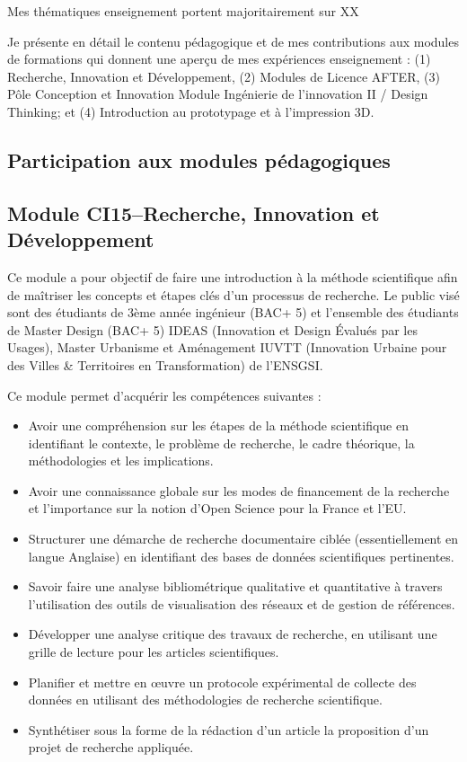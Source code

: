 \documentclass[
  11pt,
]{article}
\providecommand{\tightlist}{%
  \setlength{\itemsep}{0pt}\setlength{\parskip}{0pt}}\usepackage{longtable,booktabs,array}
\begin{document}
Mes thématiques enseignement portent majoritairement sur XX

Je présente en détail le contenu pédagogique et de mes contributions aux
modules de formations qui donnent une aperçu de mes expériences
enseignement : (1) Recherche, Innovation et Développement, (2) Modules
de Licence AFTER, (3) Pôle Conception et Innovation Module Ingénierie de
l'innovation II / Design Thinking; et (4) Introduction au prototypage et
à l'impression 3D.

\hypertarget{participation-aux-modules-puxe9dagogiques}{%
\subsection{Participation aux modules
pédagogiques}\label{participation-aux-modules-puxe9dagogiques}}

\hypertarget{module-ci15recherche-innovation-et-duxe9veloppement}{%
\subsection{Module CI15--Recherche, Innovation et
Développement}\label{module-ci15recherche-innovation-et-duxe9veloppement}}

Ce module a pour objectif de faire une introduction à la méthode
scientifique afin de maîtriser les concepts et étapes clés d'un
processus de recherche. Le public visé sont des étudiants de 3ème année
ingénieur (BAC+ 5) et l'ensemble des étudiants de Master Design (BAC+ 5)
IDEAS (Innovation et Design Évalués par les Usages), Master Urbanisme et
Aménagement IUVTT (Innovation Urbaine pour des Villes \& Territoires en
Transformation) de l'ENSGSI.

Ce module permet d'acquérir les compétences suivantes :

\begin{itemize}
\tightlist
\item
  Avoir une compréhension sur les étapes de la méthode scientifique en
  identifiant le contexte, le problème de recherche, le cadre théorique,
  la méthodologies et les implications.
\item
  Avoir une connaissance globale sur les modes de financement de la
  recherche et l'importance sur la notion d'Open Science pour la France
  et l'EU.
\item
  Structurer une démarche de recherche documentaire ciblée
  (essentiellement en langue Anglaise) en identifiant des bases de
  données scientifiques pertinentes.
\item
  Savoir faire une analyse bibliométrique qualitative et quantitative à
  travers l'utilisation des outils de visualisation des réseaux et de
  gestion de références.
\item
  Développer une analyse critique des travaux de recherche, en utilisant
  une grille de lecture pour les articles scientifiques.
\item
  Planifier et mettre en œuvre un protocole expérimental de collecte des
  données en utilisant des méthodologies de recherche scientifique.
\item
  Synthétiser sous la forme de la rédaction d'un article la proposition
  d'un projet de recherche appliquée.
\end{itemize}
\end{document}
